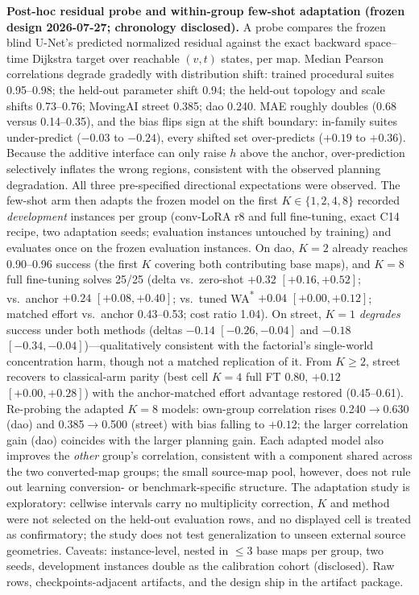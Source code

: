 \documentclass[letterpaper]{article} %
\begin{document}
\textbf{Post-hoc residual probe and within-group few-shot adaptation (frozen design 2026-07-27; chronology disclosed).} A probe compares the frozen blind U-Net's predicted normalized residual against the exact backward space--time Dijkstra target over reachable $(v,t)$ states, per map. Median Pearson correlations degrade gradedly with distribution shift: trained procedural suites 0.95--0.98; the held-out parameter shift 0.94; the held-out topology and scale shifts 0.73--0.76; MovingAI street 0.385; dao 0.240. MAE roughly doubles (0.68 versus 0.14--0.35), and the bias flips sign at the shift boundary: in-family suites under-predict ($-0.03$ to $-0.24$), every shifted set over-predicts ($+0.19$ to $+0.36$). Because the additive interface can only raise $h$ above the anchor, over-prediction selectively inflates the wrong regions, consistent with the observed planning degradation. All three pre-specified directional expectations were observed. The few-shot arm then adapts the frozen model on the first $K \in \{1,2,4,8\}$ recorded \emph{development} instances per group (conv-LoRA r8 and full fine-tuning, exact C14 recipe, two adaptation seeds; evaluation instances untouched by training) and evaluates once on the frozen evaluation instances. On dao, $K{=}2$ already reaches 0.90--0.96 success (the first $K$ covering both contributing base maps), and $K{=}8$ full fine-tuning solves 25/25 (delta vs.\ zero-shot $+0.32$ $[+0.16,+0.52]$; vs.\ anchor $+0.24$ $[+0.08,+0.40]$; vs.\ tuned WA\textsuperscript{*} $+0.04$ $[+0.00,+0.12]$; matched effort vs.\ anchor 0.43--0.53; cost ratio 1.04). On street, $K{=}1$ \emph{degrades} success under both methods (deltas $-0.14$ $[-0.26,-0.04]$ and $-0.18$ $[-0.34,-0.04]$)---qualitatively consistent with the factorial's single-world concentration harm, though not a matched replication of it. From $K \geq 2$, street recovers to classical-arm parity (best cell $K{=}4$ full FT 0.80, $+0.12$ $[+0.00,+0.28]$) with the anchor-matched effort advantage restored (0.45--0.61). Re-probing the adapted $K{=}8$ models: own-group correlation rises 0.240$\to$0.630 (dao) and 0.385$\to$0.500 (street) with bias falling to $+0.12$; the larger correlation gain (dao) coincides with the larger planning gain. Each adapted model also improves the \emph{other} group's correlation, consistent with a component shared across the two converted-map groups; the small source-map pool, however, does not rule out learning conversion- or benchmark-specific structure. The adaptation study is exploratory: cellwise intervals carry no multiplicity correction, $K$ and method were not selected on the held-out evaluation rows, and no displayed cell is treated as confirmatory; the study does not test generalization to unseen external source geometries. Caveats: instance-level, nested in $\leq$3 base maps per group, two seeds, development instances double as the calibration cohort (disclosed). Raw rows, checkpoints-adjacent artifacts, and the design ship in the artifact package.
\end{document}

